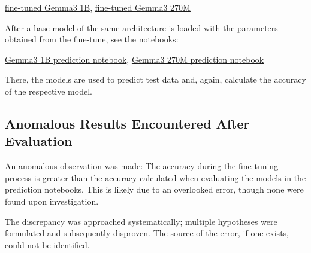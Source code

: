 \documentclass{article}
\begin{document}
\href{https://huggingface.co/AntonBOOM/big_output}{fine-tuned Gemma3 1B},
\href{https://huggingface.co/AntonBOOM/output1}{fine-tuned Gemma3 270M}

After a base model of the same architecture is loaded with the parameters obtained from the fine-tune, see the notebooks:

\href{https://github.com/AntonStantan/matura/blob/main/pre-trained-tranformers/big_gemma_huggingface_predict.ipynb}{Gemma3 1B prediction notebook},
\href{https://github.com/AntonStantan/matura/blob/main/pre-trained-tranformers/gemma-huggingface-predict.ipynb}{Gemma3 270M prediction notebook}

There, the models are used to predict test data and, again, calculate the accuracy of the respective model.

\subsection{Anomalous Results Encountered After Evaluation}

An anomalous observation was made: The accuracy during the fine-tuning process is greater than the accuracy calculated when evaluating the models in the prediction notebooks. This is likely due to an overlooked error, though none were found upon investigation.

The discrepancy was approached systematically; multiple hypotheses were formulated and subsequently disproven. The source of the error, if one exists, could not be identified.
\end{document}
